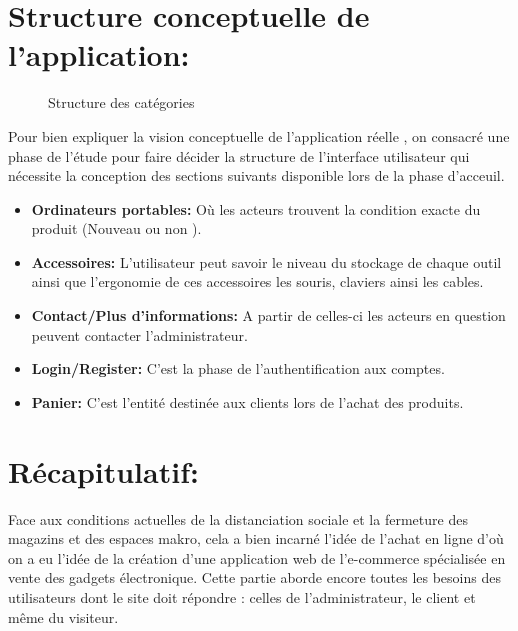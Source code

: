\documentclass[a4paper]{report}
\begin{document}
\begin{doublespace}
\begin{doublespace}
\begin{doublespace}
\begin{doublespace}
\begin{doublespace}
                    \section{Structure conceptuelle de l'application:}
                    \begin{figure}[H]
                        \begin{center}
                            \caption{Structure des catégories}
                        \end{center}
                    \end{figure}
                    Pour bien expliquer la vision conceptuelle de l'application réelle , on consacré une phase de l'étude pour faire décider la structure de l'interface utilisateur  qui nécessite la conception des  sections suivants  disponible lors de la phase d'acceuil.
                    \begin{itemize}
                        \item \textbf{Ordinateurs portables:} Où les acteurs trouvent la condition exacte du produit (Nouveau ou non ).
                        \item \textbf{Accessoires:} L'utilisateur peut savoir le niveau du stockage de chaque outil ainsi que l'ergonomie de ces accessoires les souris, claviers ainsi les cables.
                        \item \textbf{Contact/Plus d'informations:} A partir de celles-ci les acteurs en question peuvent contacter l'administrateur.
                        \item \textbf{Login/Register:} C'est la phase de l'authentification aux comptes.
                        \item \textbf{Panier:} C'est l'entité destinée aux clients lors de l'achat des produits.

                    \end{itemize}


                    \newpage
                    \section{Récapitulatif:}
                    Face aux conditions actuelles de la distanciation sociale et la fermeture des magazins et des espaces makro, cela a bien incarné l'idée de l'achat en ligne d'où on a eu l'idée de la création d’une application web de l'e-commerce spécialisée en vente des gadgets électronique. Cette partie aborde encore toutes les besoins des utilisateurs dont le site doit répondre : celles de l’administrateur, le client  et même du visiteur.


\end{doublespace}
\end{doublespace}
\end{doublespace}
\end{doublespace}
\end{doublespace}
\end{document}
